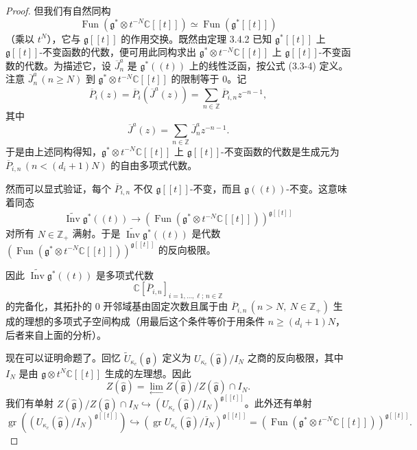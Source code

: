 \begin{proof}

但我们有自然同构
\[
    \operatorname{Fun}(\mathfrak{g}^*\otimes t^{-N}\mathbb{C}[[t]])\simeq\operatorname{Fun}(\mathfrak{g}^*[[t]])
\]
（乘以 $t^N$），它与 $\mathfrak{g}[[t]]$ 的作用交换。既然由定理 3.4.2 已知 $\mathfrak{g}^*[[t]]$ 上 $\mathfrak{g}[[t]]$-不变函数的代数，便可用此同构求出 $\mathfrak{g}^*\otimes t^{-N}\mathbb{C}[[t]]$ 上 $\mathfrak{g}[[t]]$-不变函数的代数。为描述它，设 $\overline{J}^a_n$ 是 $\mathfrak{g}^*((t))$ 上的线性泛函，按公式 (3.3-4) 定义。注意 $\overline{J}^a_n\,(n\ge N)$ 到 $\mathfrak{g}^*\otimes t^{-N}\mathbb{C}[[t]]$ 的限制等于 $0$。记
\[
    \overline{P}_i(z)=\overline{P}_i(\overline{J}^a(z))=\sum_{n\in\mathbb{Z}}\overline{P}_{i,n}z^{-n-1},
\]
其中
\[
    \overline{J}^a(z)=\sum_{n\in\mathbb{Z}}\overline{J}^a_nz^{-n-1}.
\]
于是由上述同构得知，$\mathfrak{g}^*\otimes t^{-N}\mathbb{C}[[t]]$ 上 $\mathfrak{g}[[t]]$-不变函数的代数是生成元为 $\overline{P}_{i,n}\,(n<(d_i+1)N)$ 的自由多项式代数。

然而可以显式验证，每个 $\overline{P}_{i,n}$ 不仅 $\mathfrak{g}[[t]]$-不变，而且 $\mathfrak{g}((t))$-不变。这意味着同态
\[
    \widetilde{\operatorname{Inv}}\mathfrak{g}^*((t))\longrightarrow\left(\operatorname{Fun}(\mathfrak{g}^*\otimes t^{-N}\mathbb{C}[[t]])\right)^{\mathfrak{g}[[t]]}
\]
对所有 $N\in\mathbb{Z}_+$ 满射。于是 $\widetilde{\operatorname{Inv}}\mathfrak{g}^*((t))$ 是代数 $(\operatorname{Fun}(\mathfrak{g}^*\otimes t^{-N}\mathbb{C}[[t]]))^{\mathfrak{g}[[t]]}$ 的反向极限。

因此 $\widetilde{\operatorname{Inv}}\mathfrak{g}^*((t))$ 是多项式代数
\[
    \mathbb{C}[\overline{P}_{i,n}]_{i=1,\dots,\ell;\,n\in\mathbb{Z}}
\]
的完备化，其拓扑的 $0$ 开邻域基由固定次数且属于由 $\overline{P}_{i,n}\,(n>N,\ N\in\mathbb{Z}_+)$ 生成的理想的多项式子空间构成（用最后这个条件等价于用条件 $n\ge(d_i+1)N$，后者来自上面的分析）。

现在可以证明命题了。回忆 $\widetilde{U}_{\kappa_c}(\hat{\mathfrak{g}})$ 定义为 $U_{\kappa_c}(\hat{\mathfrak{g}})/I_N$ 之商的反向极限，其中 $I_N$ 是由 $\mathfrak{g}\otimes t^N\mathbb{C}[[t]]$ 生成的左理想。因此
\[
    Z(\hat{\mathfrak{g}})=\lim_{\longleftarrow}Z(\hat{\mathfrak{g}})/Z(\hat{\mathfrak{g}})\cap I_N.
\]
我们有单射 $Z(\hat{\mathfrak{g}})/Z(\hat{\mathfrak{g}})\cap I_N\hookrightarrow(U_{\kappa_c}(\hat{\mathfrak{g}})/I_N)^{\mathfrak{g}[[t]]}$。此外还有单射
\[
    \operatorname{gr}\left((U_{\kappa_c}(\hat{\mathfrak{g}})/I_N)^{\mathfrak{g}[[t]]}\right)\hookrightarrow\left(\operatorname{gr}U_{\kappa_c}(\hat{\mathfrak{g}})/\overline{I}_N\right)^{\mathfrak{g}[[t]]}=\left(\operatorname{Fun}(\mathfrak{g}^*\otimes t^{-N}\mathbb{C}[[t]])\right)^{\mathfrak{g}[[t]]}.
\]


\end{proof}

